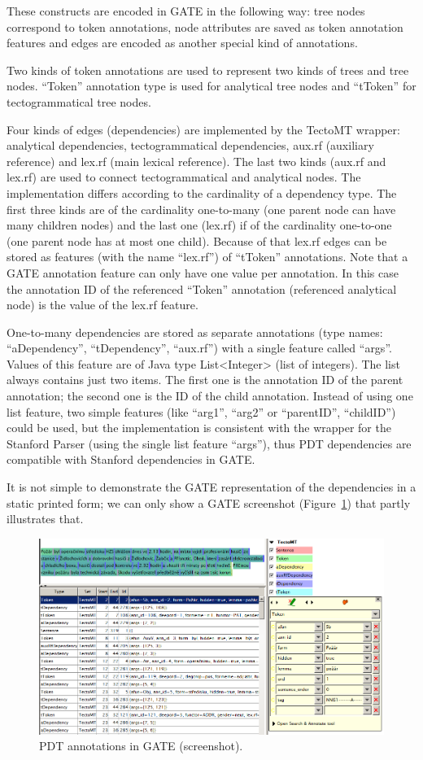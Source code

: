 These constructs are encoded in GATE in the following way: tree nodes correspond to token annotations, node attributes are saved as token annotation features and edges are encoded as another special kind of annotations.

Two kinds of token annotations are used to represent two kinds of trees and tree nodes. ``Token'' annotation type is used for analytical tree nodes and ``tToken'' for tectogrammatical tree nodes.

Four kinds of edges (dependencies) are implemented by the TectoMT wrapper: analytical dependencies, tectogrammatical dependencies, aux.rf (auxiliary reference) and lex.rf (main lexical reference). The last two kinds (aux.rf and lex.rf) are used to connect tectogrammatical and analytical nodes. The implementation differs according to the cardinality of a dependency type. The first three kinds are of the cardinality one-to-many (one parent node can have many children nodes) and the last one (lex.rf) if of the cardinality one-to-one (one parent node has at most one child). Because of that lex.rf edges can be stored as features (with the name ``lex.rf'') of ``tToken'' annotations. Note that a GATE annotation feature can only have one value per annotation. In this case the annotation ID of the referenced ``Token'' annotation (referenced analytical node) is the value of the lex.rf feature.

One-to-many dependencies are stored as separate annotations (type names: ``aDependency'', ``tDependency'', ``aux.rf'') with a single feature called ``args''. Values of this feature are of Java type List<Integer> (list of integers). The list always contains just two items. The first one is the annotation ID of the parent annotation; the second one is the ID of the child annotation. Instead of using one list feature, two simple features (like ``arg1'', ``arg2'' or ``parentID'', ``childID'') could be used, but the implementation is consistent with the wrapper for the Stanford Parser (using the single list feature ``args''), thus PDT dependencies are compatible with Stanford dependencies in GATE.

It is not simple to demonstrate the GATE representation of the dependencies in a static printed form; we can only show a GATE screenshot (Figure~\ref{fig:PDT_GATE}) that partly illustrates that.


\begin{figure}
	\centering
		\includegraphics[width=0.7\hsize]{PDT_GATE}
	\caption{PDT annotations in GATE (screenshot).}
	\label{fig:PDT_GATE}
\end{figure}



